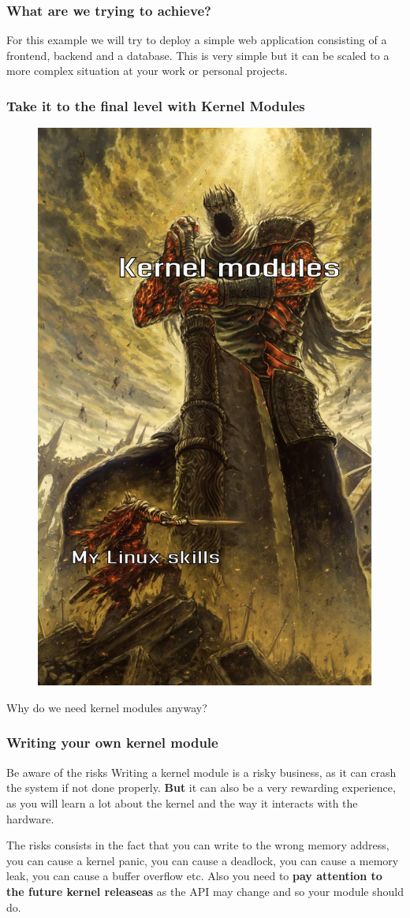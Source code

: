 \documentclass{beamer}
\begin{document}
\begin{frame}
    \frametitle{What are we trying to achieve?}
    \small For this example we will try to deploy a simple web application consisting
    of a frontend, backend and a database. \newline
    \newline
    This is very simple but it can be scaled to a more complex situation
    at your work or personal projects.
\end{frame}
\begin{frame}
    \frametitle{Take it to the final level with Kernel Modules}
    \begin{figure}
        \includegraphics[width=0.35\linewidth] {linuxkernel}
        \label{fig:linuxkernel}
    \end{figure}
    \centering \small{Why do we need kernel modules anyway?}
\end{frame}

\begin{frame}
    \frametitle{Writing your own kernel module}
    \begin{alertblock}{Be aware of the risks}
        \small
        Writing a kernel module is a risky business, as it can crash the system
        if not done properly. \newline
        \newline
        \textbf{But} it can also be a very rewarding experience, as you will
        learn a lot about the kernel and the way it interacts with the hardware.
    \end{alertblock}
    \small
    The risks consists in the fact that you can write to the wrong memory
    address, you can cause a kernel panic, you can cause a deadlock, you can
    cause a memory leak, you can cause a buffer overflow etc.
    \newline
    Also you need to \textbf{pay attention to the future kernel releaseas} as
    the API may change and so your module should do.

\end{frame}
\end{document}
